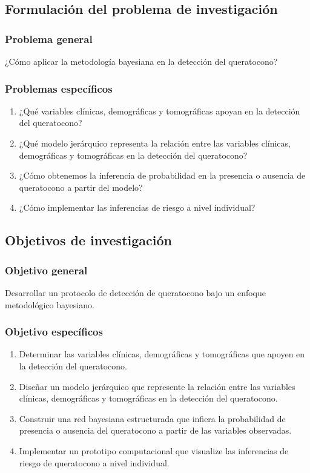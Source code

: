 \subsection{Formulación del problema de investigación}
\subsubsection{Problema general}
¿Cómo aplicar la metodología bayesiana en la detección del queratocono?

\subsubsection{Problemas específicos}
\begin{enumerate}
\item ¿Qué variables clínicas, demográficas y tomográficas apoyan en la detección del queratocono?
\item ¿Qué modelo jerárquico representa la relación entre las variables clínicas, demográficas y tomográficas en la detección del queratocono?
\item ¿Cómo obtenemos la inferencia de probabilidad en la presencia o ausencia de queratocono a partir del modelo?
\item ¿Cómo implementar las inferencias de riesgo a nivel individual?
\end{enumerate}


\subsection{Objetivos de investigación}
\subsubsection{Objetivo general}
Desarrollar un protocolo de detección de queratocono bajo un enfoque metodológico bayesiano.

\subsubsection{Objetivo específicos}
\begin{enumerate}
\item Determinar las variables clínicas, demográficas y tomográficas que apoyen en la detección del queratocono.
\item Diseñar un modelo jerárquico que represente la relación entre las variables clínicas, demográficas y tomográficas en la detección del queratocono.
\item Construir una red bayesiana estructurada que infiera la probabilidad de presencia o ausencia del queratocono a partir de las variables observadas.
\item Implementar un prototipo computacional que visualize las inferencias de riesgo de queratocono a nivel individual.
\end{enumerate}

